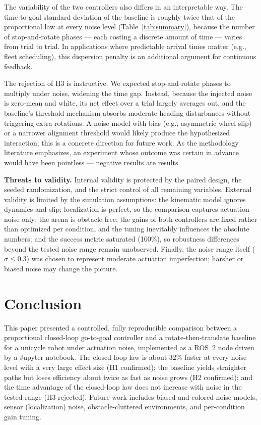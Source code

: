 \documentclass[conference]{IEEEtran}
\begin{document}
The variability of the two controllers also differs in an interpretable way.
The time-to-goal standard deviation of the baseline is roughly twice that of
the proportional law at every noise level (Table~\ref{tab:summary}), because
the number of stop-and-rotate phases --- each costing a discrete amount of
time --- varies from trial to trial. In applications where predictable
arrival times matter (e.g., fleet scheduling), this dispersion penalty is an
additional argument for continuous feedback.

The rejection of H3 is instructive. We expected stop-and-rotate phases to
multiply under noise, widening the time gap. Instead, because the injected
noise is zero-mean and white, its net effect over a trial largely averages
out, and the baseline's threshold mechanism absorbs moderate heading
disturbances without triggering extra rotations. A noise model with bias
(e.g., asymmetric wheel slip) or a narrower alignment threshold would likely
produce the hypothesized interaction; this is a concrete direction for future
work. As the methodology literature emphasizes, an experiment whose outcome
was certain in advance would have been pointless --- negative results are
results.

\textbf{Threats to validity.} Internal validity is protected by the paired
design, the seeded randomization, and the strict control of all remaining
variables. External validity is limited by the simulation assumptions: the
kinematic model ignores dynamics and slip; localization is perfect, so the
comparison captures actuation noise only; the arena is obstacle-free; the
gains of both controllers are fixed rather than optimized per condition,
and the tuning inevitably influences the absolute numbers; and the success
metric saturated (100\%), so robustness differences beyond the tested noise
range remain unobserved. Finally, the noise range itself ($\sigma\le0.3$) was
chosen to represent moderate actuation imperfection; harsher or biased noise
may change the picture.

\section{Conclusion}
This paper presented a controlled, fully reproducible comparison between a
proportional closed-loop go-to-goal controller and a rotate-then-translate
baseline for a unicycle robot under actuation noise, implemented as a ROS~2
node driven by a Jupyter notebook. The closed-loop law is about 32\% faster
at every noise level with a very large effect size (H1 confirmed); the
baseline yields straighter paths but loses efficiency about twice as fast as
noise grows (H2 confirmed); and the time advantage of the closed-loop law
does not increase with noise in the tested range (H3 rejected). Future work
includes biased and colored noise models, sensor (localization) noise,
obstacle-cluttered environments, and per-condition gain tuning.
\end{document}
